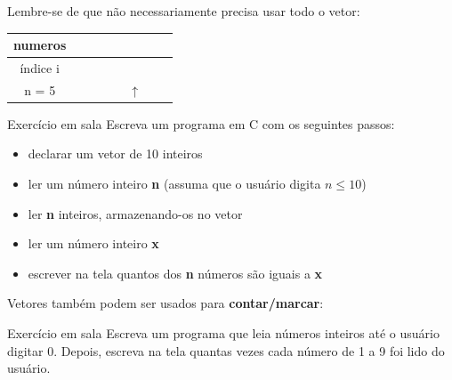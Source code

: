 \documentclass[portuguese,10pt,xcolor=table]{bredelebeamer}
\begin{document}
		\begin{frame}
			Lembre-se de que não necessariamente precisa usar todo o vetor:
			\begin{table}
				\small
				\setlength{\tabcolsep}{0pt}	
				\begin{tabular}{|c|c|c|c|c|c|c|c|}
					\hline
					numeros &\VN[8]&\VN[7]&\VN[8]&\VN[6]&\VN[5]&\WN[8]&\WN[16] \\\hline
					índice i 		&\VN[0]&\VN[1]&\VN[2]&\VN[3]&\VN[4]&\WN[5]&\WN[6] \\\hline
					n = 5 & & & & & $\uparrow$ & & \\\hline
				\end{tabular}
			\end{table}
			
		\end{frame} 


		\begin{frame}
			\begin{alertblock}{ Exercício em sala}
				Escreva um programa em C com os seguintes passos:
				\begin{itemize}
					\item declarar um vetor de 10 inteiros
					\item ler um número inteiro \textbf{n} (assuma que o usuário digita $n \le 10$)
					\item ler \textbf{n} inteiros, armazenando-os no vetor
					\item ler um número inteiro \textbf{x}
					\item escrever na tela quantos dos \textbf{n} números são iguais a \textbf{x}
				\end{itemize}
			\end{alertblock}
		\end{frame}


		\begin{frame}
			Vetores também podem ser usados para \textbf{contar/marcar}:
			
		\end{frame} 

		\begin{frame}
			\begin{alertblock}{ Exercício em sala}
				Escreva um programa que leia números inteiros até o usuário digitar 0. Depois, escreva na tela quantas vezes cada número de 1 a 9 foi lido do usuário.
			\end{alertblock}
		\end{frame}
\end{document}
